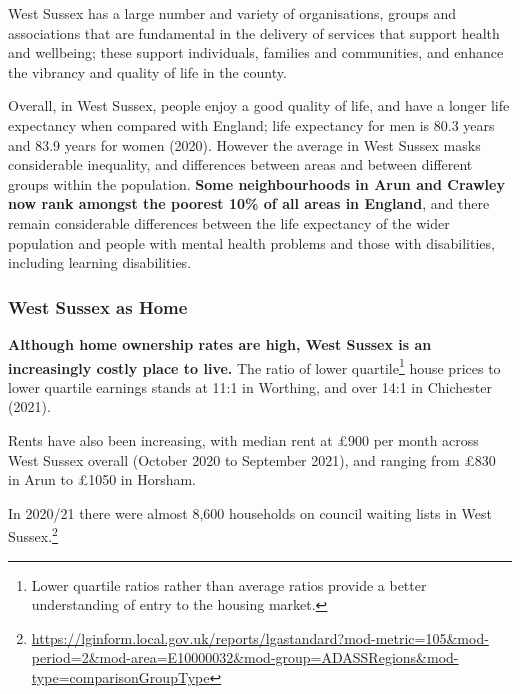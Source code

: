 West Sussex has a large number and variety of organisations, groups and associations that are fundamental in the delivery of services that support health and wellbeing; these support individuals, families and communities, and enhance the vibrancy and quality of life in the county.

Overall, in West Sussex, people enjoy a good quality of life, and have a longer life expectancy when compared with England; life expectancy for men is 80.3 years and 83.9 years for women (2020). However the average in West Sussex masks considerable inequality, and differences between areas and between different groups within the population. {\bfseries Some neighbourhoods in Arun and Crawley now rank amongst the poorest 10\% of all areas in England}, and there remain considerable differences between the life expectancy of the wider population and people with mental health problems and those with disabilities, including learning disabilities.

\subsubsection{West Sussex as Home}

{\bfseries Although home ownership rates are high, West Sussex is an increasingly costly place to live.} The ratio of lower quartile\footnote{Lower quartile ratios rather than average ratios provide a better understanding of entry to the housing market.} house prices to lower quartile earnings stands at 11:1 in Worthing, and over 14:1 in Chichester (2021).

Rents have also been increasing, with median rent at £900 per month across West Sussex overall (October 2020 to September 2021), and ranging from £830 in Arun to £1050 in Horsham.

In 2020/21 there were almost 8,600 households on council waiting lists in West Sussex.\footnote{\url{https://lginform.local.gov.uk/reports/lgastandard?mod-metric=105&mod-period=2&mod-area=E10000032&mod-group=ADASSRegions&mod-type=comparisonGroupType}}

